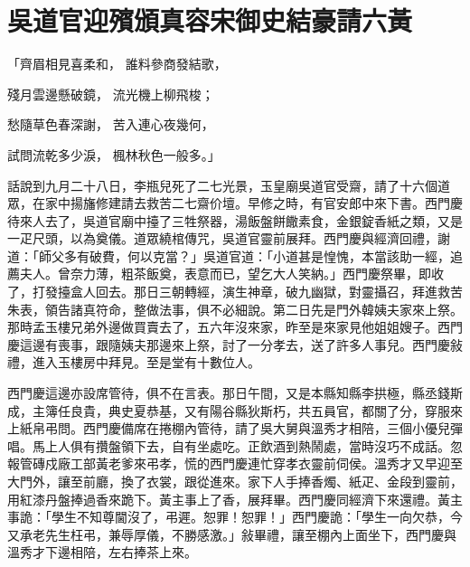 %

\chapter{吳道官迎殯頒真容\KG 宋御史結豪請六黃}


\begin{showcontents}{}



「齊眉相見喜柔和，  誰料參商發結歌，

殘月雲邊懸破鏡，  流光機上柳飛梭；

愁隨草色春深謝，  苦入連心夜幾何，

試問流乾多少淚，  楓林秋色一般多。」

話說到九月二十八日，李瓶兒死了二七光景，玉皇廟吳道官受齋，請了十六個道眾，在家中揚旛修建請去救苦二七齋价壇。早修之時，有官安郎中來下書。西門慶待來人去了，吳道官廟中擡了三牲祭器，湯飯盤餅饊素食，金銀錠香紙之類，又是一疋尺頭，以為奠儀。道眾繞棺傳咒，吳道官靈前展拜。西門慶與經濟回禮，謝道：「師父多有破費，何以克當？」吳道官道：「小道甚是惶愧，本當該助一經，追薦夫人。曾奈力薄，粗茶飯奠，表意而已，望乞大人笑納。」西門慶祭畢，即收了，打發擡盒人回去。那日三朝轉經，演生神章，破九幽獄，對靈攝召，拜進救苦朱表，領告諸真符命，整做法事，俱不必細說。第二日先是門外韓姨夫家來上祭。那時孟玉樓兄弟外邊做買賣去了，五六年沒來家，昨至是來家見他姐姐嫂子。西門慶這邊有喪事，跟隨姨夫那邊來上祭，討了一分孝去，送了許多人事兒。西門慶敍禮，進入玉樓房中拜見。至是堂有十數位人。

西門慶這邊亦設席管待，俱不在言表。那日午間，又是本縣知縣李拱極，縣丞錢斯成，主簿任良貴，典史夏恭基，又有陽谷縣狄斯朽，共五員官，都關了分，穿服來上紙帛弔問。西門慶備席在捲棚內管待，請了吳大舅與溫秀才相陪，三個小優兒彈唱。馬上人俱有攢盤領下去，自有坐處吃。正飲酒到熱鬧處，當時沒巧不成話。忽報管磚戍廠工部黃老爹來弔孝，慌的西門慶連忙穿孝衣靈前伺侯。溫秀才又早迎至大門外，讓至前廳，換了衣裳，跟從進來。家下人手捧香燭、紙疋、金段到靈前，用紅漆丹盤捧過香來跪下。黃主事上了香，展拜畢。西門慶同經濟下來還禮。黃主事詭：「學生不知尊閫沒了，弔遲。恕罪！恕罪！」西門慶詭：「學生一向欠恭，今又承老先生枉弔，兼辱厚儀，不勝感激。」敍畢禮，讓至棚內上面坐下，西門慶與溫秀才下邊相陪，左右捧茶上來。


\end{showcontents}
